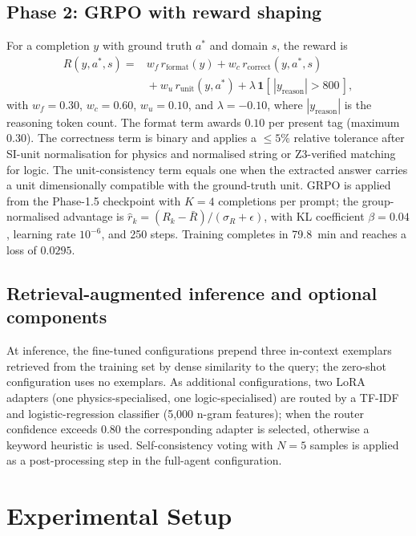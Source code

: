 \documentclass[APA,twocolumn]{USG}
\begin{document}
\subsection{Phase 2: GRPO with reward shaping}
For a completion $y$ with ground truth $a^{*}$ and domain $s$, the reward is
\begin{equation}
\begin{split}
R(y,a^{*},s)={}&w_f\,r_{\text{format}}(y)+w_c\,r_{\text{correct}}(y,a^{*},s)\\
&{}+w_u\,r_{\text{unit}}(y,a^{*})+\lambda\,\mathbf{1}[\,|y_{\text{reason}}|>800\,],
\end{split}
\label{eq:reward}
\end{equation}
with $w_f{=}0.30$, $w_c{=}0.60$, $w_u{=}0.10$, and $\lambda{=}-0.10$, where
$|y_{\text{reason}}|$ is the reasoning token count. The format term awards
$0.10$ per present tag (maximum $0.30$). The correctness term is binary and
applies a $\le 5\%$ relative tolerance after SI-unit normalisation for physics
and normalised string or Z3-verified matching for logic. The unit-consistency
term equals one when the extracted answer carries a unit dimensionally
compatible with the ground-truth unit. GRPO \citep{Shao2024} is applied from the
Phase-1.5 checkpoint with $K{=}4$ completions per prompt; the group-normalised
advantage is $\hat{r}_k=(R_k-\bar{R})/(\sigma_R+\epsilon)$, with KL coefficient
$\beta{=}0.04$, learning rate $10^{-6}$, and 250 steps. Training completes in
79.8~min and reaches a loss of $0.0295$.

\subsection{Retrieval-augmented inference and optional components}
At inference, the fine-tuned configurations prepend three in-context exemplars
retrieved from the training set by dense similarity to the query; the zero-shot
configuration uses no exemplars. As additional configurations, two LoRA
adapters (one physics-specialised, one logic-specialised) are routed by a
TF-IDF and logistic-regression classifier (5{,}000 n-gram features); when the
router confidence exceeds $0.80$ the corresponding adapter is selected,
otherwise a keyword heuristic is used. Self-consistency voting with $N{=}5$
samples is applied as a post-processing step in the full-agent configuration.

\section{Experimental Setup}\label{sec5}
\end{document}
